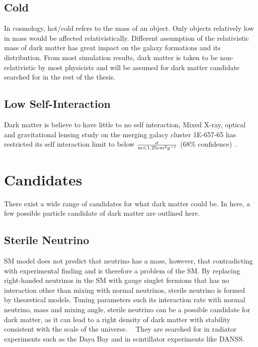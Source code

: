 \subsection{Cold}
In cosmology, hot/cold refers to the mass of an object. Only objects relatively low in mass would be affected relativistically. Different assumption of the relativistic mass of dark matter has great impact on the galaxy formations and its distribution. From most simulation results, dark matter is taken to be non-relativistic by most physicists and will be assumed for dark matter candidate searched for in the rest of the thesis. 

\subsection{Low Self-Interaction}
Dark matter is believe to have little to no self interaction, Mixed X-ray, optical and gravitational lensing study on the merging galacy cluster 1E-657-65 has restricted its self interaction limit to below $\sigma \over m < 1.25 cm^{2} g^{-1}$ (68\% confidence)~\cite{randall2008constraints}. 
 

\section{Candidates}
\label{section:candidates}

There exist a wide range of candidates for what dark matter could be. In here, a few possible particle candidate of dark matter are outlined here. 

\subsection{Sterile Neutrino}
SM model does not predict that neutrino has a mass, however, that contradicting with experimental finding and is therefore a problem of the SM. By replacing right-handed neutrinos in the SM with gauge singlet fermions that has no interaction other than mixing with normal neutrinos, sterile neutrino is formed by theoretical models. Tuning parameters such its interaction rate with normal neutrino, mass and mixing angle, sterile neutrino can be a possible candidate for dark matter, as it can lead to a right
density of dark matter with stability consistent with the scale of the universe. ~\cite{dodelson1994sterile} They are searched for in radiator experiments such as the Daya Bay \cite{an2014search, wong2017search} and in scintillator experiments like DANSS. ~\cite{alekseev2018search}

